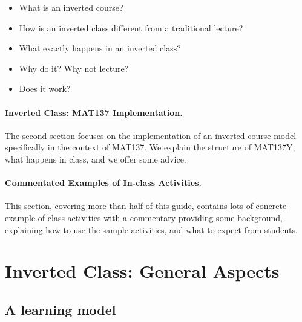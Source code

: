 \documentclass[11pt]{article}
\begin{document}
\begin{itemize}
\item What is an inverted course?
\vspace{-1mm}
\item How is an inverted class different from a traditional lecture?
\vspace{-1mm}
\item What exactly happens in an inverted class?
\vspace{-1mm}
\item Why do it? Why not lecture?
\vspace{-1mm}
\item Does it work?
\end{itemize}

	\paragraph{\hyperref[sec:structure]{Inverted Class: MAT137 Implementation.}} The second section focuses on the implementation of an inverted course model specifically in the context of MAT137. We explain the structure of MAT137Y, what happens in class, and we offer some advice.
	
	\paragraph{\hyperref[sec:activities]{Commentated Examples of In-class Activities.}} This section, covering more than half of this guide, contains lots of concrete example of class activities with a commentary providing some background, explaining how to use the sample activities, and what to expect from students.


\tableofcontents


\newpage

\renewcommand{\baselinestretch}{1.3} %


\section[1. Inverted Class: General Aspects]{Inverted Class: General Aspects} \label{sec:general}


\subsection{A learning model} \label{sec:model}
\end{document}
